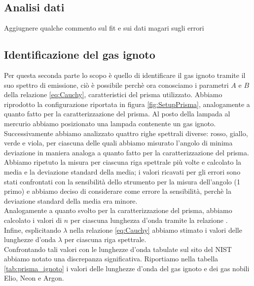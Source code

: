 \documentclass[letterpaper,12pt]{article}
\begin{document}
\subsection{Analisi dati}

Aggiugnere qualche commento sul fit e sui dati magari sugli errori


\subsection{Identificazione del gas ignoto}
Per questa seconda parte lo scopo è quello di identificare il gas ignoto tramite il suo spettro di emissione, ciò è possibile 
perchè ora conosciamo  i parametri $A$ e $B$ della relazione \ref{eq:Cauchy}, caratteristici del prisma utilizzato.
Abbiamo riprodotto la configurazione riportata in figura \ref{fig:SetupPrisma}, analogamente a quanto fatto per la 
caratterizzazione del prisma. Al posto della lampada al mercurio abbiamo posizionato una lampada contenente un gas
ignoto.
Successivamente abbiamo analizzato quattro righe spettrali diverse: rosso, giallo, verde e viola, per ciascuna delle quali abbiamo
misurato l'angolo di minima deviazione in maniera analoga a quanto fatto per la caratterizzazione del prisma. Abbiamo 
ripetuto la misura per ciascuna riga spettrale più volte e calcolato la media e la deviazione standard della media; i
valori ricavati per gli errori sono stati confrontati con la sensibilità dello strumento per la misura dell'angolo (1 primo) e abbiamo deciso di
considerare come errore la sensibilità, perchè la deviazione standard della media era minore. \\
Analogamente a quanto svolto per la caratterizzazione del prisma, abbiamo calcolato i valori di $n$ per ciascuna
lunghezza d'onda tramite la relazione .\\
Infine, esplicitando
$\lambda$ nella relazione \ref{eq:Cauchy} abbiamo stimato i valori delle lunghezze d'onda $\lambda$ per ciascuna riga spettrale. \\
Confrontando tali valori con le lunghezze d'onda tabulate sul sito del NIST abbiamo notato una discrepanza significativa.
Riportiamo nella tabella \ref{tab:prisma_ignoto} i valori delle lunghezze d'onda del gas ignoto e dei gas nobili Elio, Neon e Argon.
\end{document}
